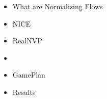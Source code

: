 \begin{frame}
\begin{itemize}
    \item What are Normalizing Flows
    \item NICE
    \item RealNVP
    \item \textbf{\color{red}{GLOW}}
    \item GamePlan
    \item Results
\end{itemize}
\end{frame}

